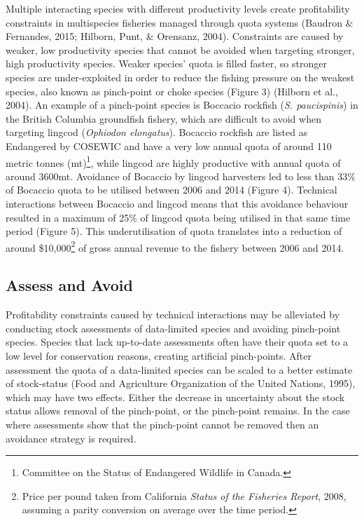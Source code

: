 \documentclass[12pt,]{scrartcl}
\begin{document}
Multiple interacting species with different productivity levels create
profitability constraints in multispecies fisheries managed through
quota systems (Baudron \& Fernandes, 2015; Hilborn, Punt, \& Orensanz,
2004). Constraints are caused by weaker, low productivity species that
cannot be avoided when targeting stronger, high productivity species.
Weaker species' quota is filled faster, so stronger species are
under-exploited in order to reduce the fishing pressure on the weakest
species, also known as pinch-point or choke species (Figure 3) (Hilborn
et al., 2004). An example of a pinch-point species is Boccacio rockfish
(\emph{S. paucispinis}) in the British Columbia groundfish fishery,
which are difficult to avoid when targeting lingcod (\emph{Ophiodon
elongatus}). Bocaccio rockfish are listed as Endangered by COSEWIC and
have a very low annual quota of around 110 metric tonnes (mt)\footnote{Committee
  on the Status of Endangered Wildlife in Canada.}, while lingcod are
highly productive with annual quota of around 3600mt. Avoidance of
Bocaccio by lingcod harvesters led to less than 33\% of Bocaccio quota
to be utilised between 2006 and 2014 (Figure 4). Technical interactions
between Bocaccio and lingcod means that this avoidance behaviour
resulted in a maximum of 25\% of lingcod quota being utilised in that
same time period (Figure 5). This underutilisation of quota translates
into a reduction of around \$10,000\footnote{Price per pound taken from
  California \emph{Status of the Fisheries Report}, 2008, assuming a
  parity conversion on average over the time period.} of gross annual
revenue to the fishery between 2006 and 2014.

\subsection{Assess and Avoid}\label{assess-and-avoid}

Profitability constraints caused by technical interactions may be
alleviated by conducting stock assessments of data-limited species and
avoiding pinch-point species. Species that lack up-to-date assessments
often have their quota set to a low level for conservation reasons,
creating artificial pinch-points. After assessment the quota of a
data-limited species can be scaled to a better estimate of stock-status
(Food and Agriculture Organization of the United Nations, 1995), which
may have two effects. Either the decrease in uncertainty about the stock
status allows removal of the pinch-point, or the pinch-point remains. In
the case where assessments show that the pinch-point cannot be removed
then an avoidance strategy is required.
\end{document}
